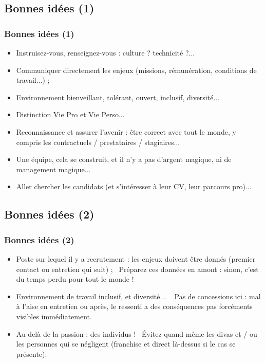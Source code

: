 \documentclass[slidetop,11pt]{beamer}
\begin{document}
\subsection{Bonnes id{\'e}es (1)}
\begin{frame}
	\frametitle{Bonnes id{\'e}es (1)}
	\begin{itemize}
		\item Instruisez-vous, renseignez-vous : culture ? technicit{\'e} ?...
		\item Communiquer directement les enjeux (missions, r{\'e}mun{\'e}ration, conditions de travail...) ;
		\item Environnement bienveillant, tol{\'e}rant, ouvert, inclusif, diversit{\'e}...
		\item Distinction Vie Pro et Vie Perso...
		\item Reconnaissance et assurer l'avenir : {\^e}tre correct avec tout le monde, y compris les contractuels / prestataires / stagiaires...
		\item Une {\'e}quipe, cela se construit, et il n'y a pas d'argent magique, ni de management magique...
		\item Aller chercher les candidats (et s'int{\'e}resser {\`a} leur CV, leur parcours pro)...
	\end{itemize} 
\end{frame}

\subsection{Bonnes id{\'e}es (2)}
\begin{frame}
	\frametitle{Bonnes id{\'e}es (2)}
	\begin{itemize}
		\item Poste sur lequel il y a recrutement : les enjeux doivent {\^e}tre donn{\'e}s (premier contact ou entretien qui suit) ;~\newline
		Pr{\'e}parez ces donn{\'e}es en amont : sinon, c'est du temps perdu pour tout le monde !
		
		\item Environnement de travail inclusif, et diversit{\'e}... ~\newline
		Pas de concessions ici : mal {\`a} l'aise en entretien ou apr{\`e}s, le ressenti a des cons{\'e}quences pas forc{\'e}ments visibles imm{\'e}diatement.
		
		\item Au-del{\`a} de la passion : des individus !~\newline
		{\'E}vitez quand m{\^e}me les divas et / ou les personnes qui se n{\'e}gligent (franchise et direct l{\`a}-dessus si le cas se pr{\'e}sente). 
	\end{itemize} 
\end{frame}
\end{document}
